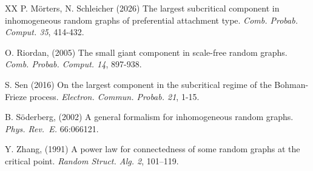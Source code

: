 \documentclass[12pt,a4paper]{article}
\numberwithin{equation}{section}
\begin{document}
{\begin{thebibliography}{XX}
 P. Mörters, N. Schleicher (2026) The largest subcritical component in inhomogeneous random graphs of preferential attachment type. \textit{Comb. Probab. Comput. 35}, 414-432.

         
           O. Riordan, (2005) The small giant component in scale-free random graphs.
	\textit{Comb. Probab. Comput. 14}, 897-938.

S. Sen (2016) On the largest component in the subcritical regime of the Bohman-Frieze process. \textit{Electron. Commun. Probab. 21}, 1-15.  

          B. Söderberg, (2002) A general formalism for inhomogeneous random graphs.
         \textit{Phys. Rev.~E.} 66:066121.

           Y. Zhang, (1991) A power law for connectedness of some random graphs at the critical point. 
         \textit{ Random Struct. Alg. 2}, 101–119.
         

\end{thebibliography}}
\end{document}
